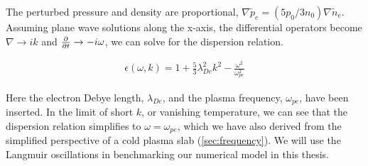	The perturbed pressure and density are proportional, \(\nabla \tilde{p}_e = \left(5p_0/3n_0\right)\nabla \tilde{n}_e\).
	Assuming plane wave solutions along the x-axis, the differential operators become \(\nabla \rightarrow ik\)
 	and \(\pdv{}{t} \rightarrow -i\omega\), we can solve for the dispersion relation.

	\begin{align}
	\epsilon(\omega, k) = 1 + \frac{5}{3} \lambda_{De}^2k ^2 -  \frac{\omega^2}{\omega_{pe}^2} \label{eq:disp}
	\end{align}

	Here the electron Debye length, \(\lambda_{De}\), and the plasma frequency, \(\omega_{pe}\), have been inserted.
	In the limit of short \(k\), or vanishing temperature, we can see that the dispersion relation simplifies to \(\omega = \omega_{pe}\), which
	we have also derived from the simplified perspective of a cold plasma slab (\cref{sec:frequency}).
	We will use the Langmuir oscillations in benchmarking our numerical model in this thesis.


